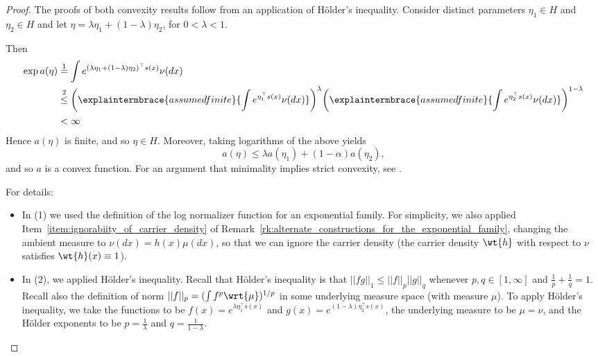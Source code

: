 \documentclass{article} %
\newcommand{\logNormalizerFunction}{a}
\newcommand{\sufficientStatsFunction}{s}
\newcommand{\carrierDensity}{h}
\newcommand{\naturalParamSpace}{H}
\begin{document}
\begin{proof}
The proofs of both convexity results follow from an application of H\"{o}lder’s inequality. Consider distinct parameters $\eta_1 \in \naturalParamSpace$ and $\eta_2 \in \naturalParamSpace$ and let $\eta = \lambda \eta_1 + (1-\lambda) \eta_2$, for $0 < \lambda < 1$.  

Then
%
\begin{align*}
\exp \logNormalizerFunction(\eta) & \stackrel{1}{=} \int e^{(\lambda \eta_1 + (1-\lambda) \eta_2)^\top \sufficientStatsFunction(x)}  \nu(dx)  \\
& \stackrel{2}{\leq} \bigg( \explaintermbrace{assumed finite}{\int e^{\eta_1^\top \sufficientStatsFunction(x)}  \nu(dx)} \bigg)^\lambda \bigg(  \explaintermbrace{assumed finite}{\int e^{\eta_2^\top \sufficientStatsFunction(x)}  \nu(dx)} \bigg)^{1-\lambda} \\
& < \infty  
\end{align*}
%
Hence $\logNormalizerFunction(\eta)$ is finite, and so $\eta \in \naturalParamSpace$.   Moreover, taking logarithms of the above yields
%
\[\logNormalizerFunction(\eta) \leq \lambda \logNormalizerFunction(\eta_1) + (1-\alpha) \logNormalizerFunction(\eta_2), \]
%
and so $\logNormalizerFunction$ is a convex function.   For an argument that minimality implies strict convexity, see \citet{jordan2010exponential}.

For details:
\begin{itemize}
	\item In (1) we used the definition of the log normalizer function for an exponential family. For simplicity, we also applied Item~\ref{item:ignorabiity_of_carrier_density} of Remark~\ref{rk:alternate_constructions_for_the_exponential_family}, changing the ambient measure to $\nu(dx) = h(x) \mu(dx)$, so that we can ignore the carrier density (the carrier density $\wt{\carrierDensity}$ with respect to $\nu$ satisfies $\wt{\carrierDensity}(x) \equiv 1$).
	\item In (2), we applied H\"{o}lder’s inequality.  Recall that H\"{o}lder’s inequality is that $||fg||_1 \leq ||f||_p ||g||_q$ whenever $p,q \in [1,\infty]$ and $\frac{1}{p} + \frac{1}{q}=1$.  Recall also the definition of norm $||f||_p = (\int f^p \wrt{\mu})^{1/p}$ in some underlying measure space (with measure $\mu$).  To apply H\"{o}lder’s inequality, we take the functions to be $f(x) = e^{\lambda \eta_1^\top \sufficientStatsFunction(x)}$ and $g(x) = e^{(1-\lambda)\eta_2^\top \sufficientStatsFunction(x)}$, the underlying measure to be $\mu=\nu$, and the H\"{o}lder exponents to be $p=\frac{1}{\lambda}$ and $q=\frac{1}{1-\lambda}$. 
\end{itemize} 
\end{proof}
\end{document}
